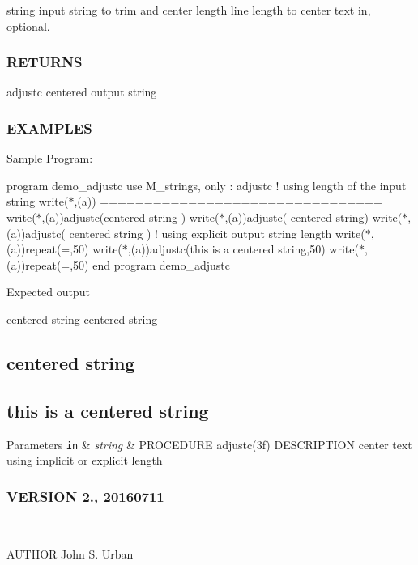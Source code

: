 string input string to trim and center length line length to center text in, optional. \subsubsection*{R\+E\+T\+U\+R\+NS}

adjustc centered output string

\subsubsection*{E\+X\+A\+M\+P\+L\+ES}

Sample Program\+:

program demo\+\_\+adjustc use M\+\_\+strings, only \+: adjustc ! using length of the input string write($\ast$,\textquotesingle{}(a)\textquotesingle{}) \textquotesingle{}================================\textquotesingle{} write($\ast$,\textquotesingle{}(a)\textquotesingle{})adjustc(\textquotesingle{}centered string \textquotesingle{}) write($\ast$,\textquotesingle{}(a)\textquotesingle{})adjustc(\textquotesingle{} centered string\textquotesingle{}) write($\ast$,\textquotesingle{}(a)\textquotesingle{})adjustc(\textquotesingle{} centered string \textquotesingle{}) ! using explicit output string length write($\ast$,\textquotesingle{}(a)\textquotesingle{})repeat(\textquotesingle{}=\textquotesingle{},50) write($\ast$,\textquotesingle{}(a)\textquotesingle{})adjustc(\textquotesingle{}this is a centered string\textquotesingle{},50) write($\ast$,\textquotesingle{}(a)\textquotesingle{})repeat(\textquotesingle{}=\textquotesingle{},50) end program demo\+\_\+adjustc

Expected output 

 centered string centered string \subsection*{centered string }

\subsection*{this is a centered string }


\begin{DoxyParams}[1]{Parameters}
\mbox{\tt in}  & {\em string} & P\+R\+O\+C\+E\+D\+U\+RE adjustc(3f) D\+E\+S\+C\+R\+I\+P\+T\+I\+ON center text using implicit or explicit length \subsubsection*{V\+E\+R\+S\+I\+ON 2., 20160711}\\
\hline
\end{DoxyParams}
A\+U\+T\+H\+OR John S. Urban \mbox{\label{namespacem__strings_a635ef6f1dd73400e7b339392886d6357}} 
